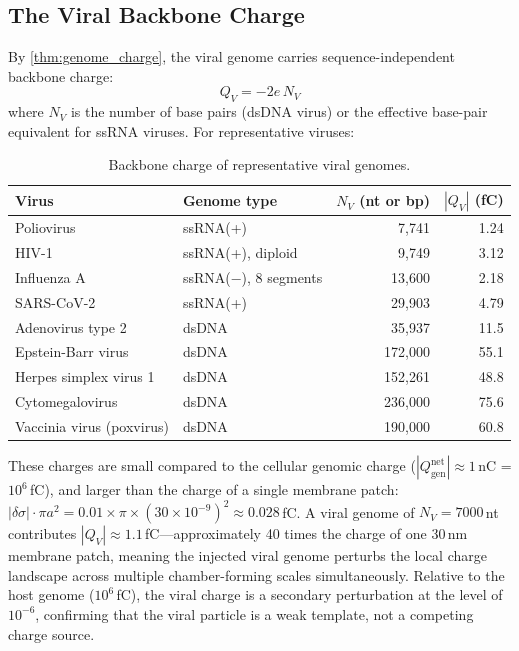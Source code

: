 \documentclass[12pt,a4paper]{article}
\theoremstyle{definition}
\theoremstyle{remark}
\newcommand{\Qgen}{Q_{\mathrm{gen}}}
\newcommand{\abs}[1]{\left|#1\right|}
\begin{document}
\subsection{The Viral Backbone Charge}

By \cref{thm:genome_charge}, the viral genome carries sequence-independent backbone charge:
\begin{equation}
  Q_V = -2e \, N_V
  \label{eq:viral_charge}
\end{equation}
where $N_V$ is the number of base pairs (dsDNA virus) or the effective base-pair equivalent for ssRNA viruses. For representative viruses:

\begin{table}[h]
\centering
\caption{Backbone charge of representative viral genomes.}
\label{tab:viral_charges}
\begin{tabular}{llrr}
\toprule
Virus & Genome type & $N_V$ (nt or bp) & $\abs{Q_V}$ (fC) \\
\midrule
Poliovirus & ssRNA(+) & 7,741 & 1.24 \\
HIV-1 & ssRNA(+), diploid & 9,749 & 3.12 \\
Influenza A & ssRNA($-$), 8 segments & 13,600 & 2.18 \\
SARS-CoV-2 & ssRNA(+) & 29,903 & 4.79 \\
Adenovirus type 2 & dsDNA & 35,937 & 11.5 \\
Epstein-Barr virus & dsDNA & 172,000 & 55.1 \\
Herpes simplex virus 1 & dsDNA & 152,261 & 48.8 \\
Cytomegalovirus & dsDNA & 236,000 & 75.6 \\
Vaccinia virus (poxvirus) & dsDNA & 190,000 & 60.8 \\
\bottomrule
\end{tabular}
\end{table}

These charges are small compared to the cellular genomic charge ($\abs{\Qgen^{\mathrm{net}}} \approx 1$\,nC = $10^6$\,fC), and larger than the charge of a single membrane patch: $\abs{\delta\sigma} \cdot \pi a^2 = 0.01 \times \pi \times (30 \times 10^{-9})^2 \approx 0.028$\,fC. A viral genome of $N_V = 7000$\,nt contributes $\abs{Q_V} \approx 1.1$\,fC---approximately 40 times the charge of one 30\,nm membrane patch, meaning the injected viral genome perturbs the local charge landscape across multiple chamber-forming scales simultaneously. Relative to the host genome ($10^6$\,fC), the viral charge is a secondary perturbation at the level of $10^{-6}$, confirming that the viral particle is a weak template, not a competing charge source.
\end{document}
